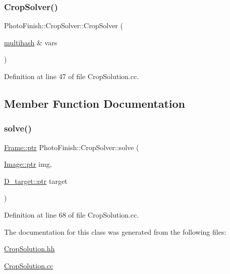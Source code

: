 \subsubsection{\texorpdfstring{Crop\+Solver()}{CropSolver()}}
{\footnotesize\ttfamily Photo\+Finish\+::\+Crop\+Solver\+::\+Crop\+Solver (\begin{DoxyParamCaption}\item[{\hyperlink{namespace_photo_finish_a6f41796f162687538b7da5c7a95e2d18}{multihash} \&}]{vars }\end{DoxyParamCaption})}



Definition at line 47 of file Crop\+Solution.\+cc.



\subsection{Member Function Documentation}
\mbox{\label{class_photo_finish_1_1_crop_solver_a04f0f268ad8a51da6183121d2b1de9cc}} 
\subsubsection{\texorpdfstring{solve()}{solve()}}
{\footnotesize\ttfamily \hyperlink{class_photo_finish_1_1_frame_aaf5eaa56b8096024c0d45ad9e7f5e6c1}{Frame\+::ptr} Photo\+Finish\+::\+Crop\+Solver\+::solve (\begin{DoxyParamCaption}\item[{\hyperlink{class_photo_finish_1_1_image_ab336203305ed3a1397d7245063353b5a}{Image\+::ptr}}]{img,  }\item[{\hyperlink{class_photo_finish_1_1_d__target_a44befb9c758d25b0c765e97caa1caa39}{D\+\_\+target\+::ptr}}]{target }\end{DoxyParamCaption})}



Definition at line 68 of file Crop\+Solution.\+cc.



The documentation for this class was generated from the following files\+:\begin{DoxyCompactItemize}
\item 
\hyperlink{_crop_solution_8hh}{Crop\+Solution.\+hh}\item 
\hyperlink{_crop_solution_8cc}{Crop\+Solution.\+cc}\end{DoxyCompactItemize}
